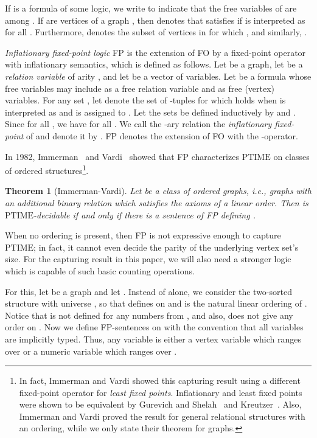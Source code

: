 \documentclass[10pt]{article}
\newtheorem{thm}{Theorem}[section]
\theoremstyle{remark}
\theoremstyle{definition}
\theoremstyle{plain}
\newcommand{\logic}[1]{\textsf{\upshape\relsize{-0.5}#1}\xspace}
\newcommand{\FP}{\logic{FP}}
\newcommand{\FOL}{\logic{FO}}
\newcommand{\cclass}[1]{\ensuremath{\mathrm{#1}}\xspace}
\newcommand{\PTIME}{\cclass{PTIME}}
\begin{document}
If  is a formula of some logic, we write  to indicate that the free variables of  are among . If  are vertices of a graph , then  denotes that  satisfies  if  is interpreted as  for all . Furthermore,  denotes the subset of vertices  in  for which , and similarly, .

\emph{Inflationary fixed-point logic} \FP is the extension of \FOL by a fixed-point operator with inflationary semantics, which is defined as follows. Let  be a graph, let  be a \emph{relation variable} of arity , and let  be a vector of  variables. Let  be a formula whose free variables may include  as a free relation variable and  as free (vertex) variables. For any set , let  denote the set of -tuples  for which  holds when  is interpreted as  and  is assigned to . Let the sets  be defined inductively by  and .  Since  for all , we have  for all . We call the -ary relation  the \emph{inflationary fixed-point} of  and denote it by . \FP denotes the extension of \FOL with the -operator.

In 1982, Immerman~\cite{immerman82bounds} and Vardi~\cite{vardi82complexity} showed that \FP characterizes \PTIME on classes of ordered structures\footnote{In fact, Immerman and Vardi showed this capturing result using a different fixed-point operator for \emph{least fixed points}. Inflationary and least fixed points were shown to be equivalent by Gurevich and Shelah~\cite{gurevich85fixed-point} and Kreutzer~\cite{kreutzer04equivalence}. Also, Immerman and Vardi proved the result for general relational structures with an ordering, while we only state their theorem for graphs.}.

\begin{thm}[Immerman-Vardi]\label{thm:immermanVardi}
Let  be a class of ordered graphs, i.e., graphs with an additional binary relation  which satisfies the axioms of a linear order. Then  is \PTIME-decidable if and only if there is a sentence of \FP defining .
\end{thm}

When no ordering is present, then \FP is not expressive enough to capture \PTIME; in fact, it cannot even decide the parity of the underlying vertex set's size. For the capturing result in this paper, we will also need a stronger logic which is capable of such basic counting operations.

For this, let  be a graph and let . Instead of  alone, we consider the two-sorted structure  with universe , so that  defines  on  and  is the natural linear ordering of . Notice that  is not defined for any numbers from , and also,  does not give any order on . Now we define \FP-sentences on  with the convention that all variables are implicitly typed. Thus, any variable  is either a vertex variable which ranges over  or a numeric variable which ranges over .
\end{document}
